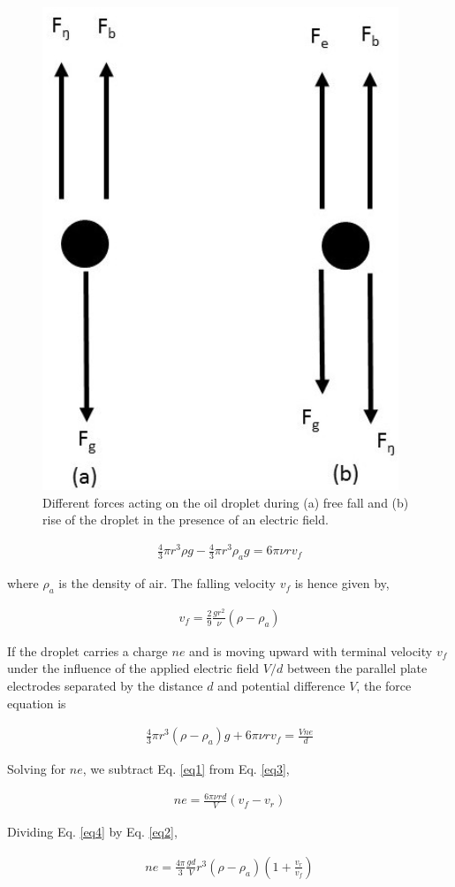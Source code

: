 \begin{figure}[H]
    \centering
    \includegraphics[width=.4\columnwidth]{images/1.png}
    \caption{Different forces acting on the oil droplet during (a) free fall and (b) rise of the droplet in the presence of an electric field.}
    \label{1}
\end{figure}

\begin{align} \label{eq1}
    \frac{4}{3}\pi r^3 \rho g - \frac{4}{3}\pi r^3 \rho_a g = 6\pi \nu rv_f
\end{align}

where $\rho_a$ is the density of air. The falling velocity $v_f$ is hence given by,

\begin{align} \label{eq2}
    v_f = \frac{2}{9} \frac{gr^2}{\nu} (\rho-\rho_a)
\end{align}

If the droplet carries a charge $ne$ and is moving upward
with terminal velocity $v_f$ under the influence of the applied electric field $V/d$ between the parallel plate electrodes separated by the distance $d$ and potential difference $V$, the force equation is

\begin{align} \label{eq3}
    \frac{4}{3}\pi r^3 (\rho-\rho_a) g + 6\pi \nu rv_f = \frac{Vne}{d}
\end{align}

Solving for $ne$, we subtract Eq. \ref{eq1} from Eq. \ref{eq3},

\begin{align} \label{eq4}
    ne = \frac{6\pi \nu rd}{V}(v_f-v_r)
\end{align}

Dividing Eq. \ref{eq4} by Eq. \ref{eq2},

\begin{align} \label{eq5}
    \boxed{ne = \frac{4\pi}{3}\frac{gd}{V}r^3(\rho-\rho_a)\left(1+\frac{v_r}{v_f}\right)}
\end{align}

